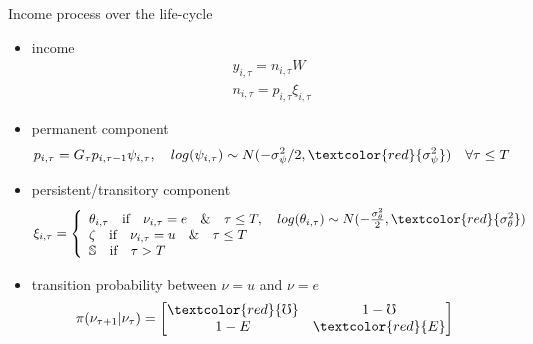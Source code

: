 \documentclass{beamer}
\begin{document}
\begin{frame}{Income process over the life-cycle}
	\begin{itemize}
		\item income
	\begin{equation*}
		\begin{split}
			y_{i,\tau} = n_{i,\tau}W  \\
			n_{i,\tau} = p_{i,\tau}\xi_{i,\tau}
		\end{split}
	\end{equation*}
	\item permanent component 
\begin{equation*}
	\begin{split}
		p_{i,\tau} = G_\tau p_{i,\tau-1}\psi_{i,\tau}, \quad
		log (\psi_{i,\tau}) \sim N(-\sigma^2_{\psi}/2,\textcolor{red}{\sigma^2_{\psi}}) \quad \forall \tau \leq T \\
	\end{split}
\end{equation*}
	\item persistent/transitory component 
\begin{equation*}
	\begin{split}
\xi_{i,\tau} =   \left\{
\begin{array}{ll}
	\theta_{i,\tau} \quad \text{if} \quad \nu_{i,\tau} =e \quad \& \quad  \tau \leq T, \quad log(\theta_{i,\tau}) \sim N(-\frac{\sigma^2_\theta}{2},\textcolor{red}{\sigma^2_\theta})\\
	\zeta \quad \text{if} \quad \nu_{i,\tau} = u \quad \& \quad \tau \leq T  \\
	\mathbb{S} \quad \text{if}  \quad \tau > T
\end{array} \right. 
\end{split}
\end{equation*}
	\item transition probability between $\nu=u$ and $\nu=e$
\begin{equation*}
	\pi (\nu_{\tau+1}|\nu_{\tau})= 
	\begin{bmatrix} 
		\textcolor{red}{\mho} & 1-\mho  \\
		1-E & \textcolor{red}{E}
	\end{bmatrix}
	\quad
\end{equation*}
	\end{itemize}
\end{frame}
\end{document}
